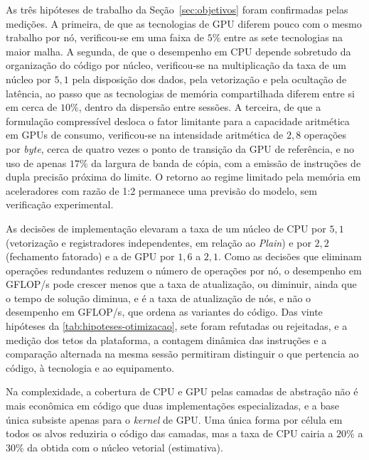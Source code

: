 As três hipóteses de trabalho da Seção~\ref{sec:objetivos} foram confirmadas pelas medições.
A primeira, de que as tecnologias de GPU diferem pouco com o mesmo trabalho por nó, verificou-se em uma faixa de \(5\%\) entre as sete tecnologias na maior malha.
A segunda, de que o desempenho em CPU depende sobretudo da organização do código por núcleo, verificou-se na multiplicação da taxa de um núcleo por \(5{,}1\) pela disposição dos dados, pela vetorização e pela ocultação de latência, ao passo que as tecnologias de memória compartilhada diferem entre si em cerca de \(10\%\), dentro da dispersão entre sessões.
A terceira, de que a formulação compressível desloca o fator limitante para a capacidade aritmética em GPUs de consumo, verificou-se na intensidade aritmética de \(2{,}8\) operações por \textit{byte}, cerca de quatro vezes o ponto de transição da GPU de referência, e no uso de apenas \(17\%\) da largura de banda de cópia, com a emissão de instruções de dupla precisão próxima do limite.
O retorno ao regime limitado pela memória em aceleradores com razão de 1:2 permanece uma previsão do modelo, sem verificação experimental.

As decisões de implementação elevaram a taxa de um núcleo de CPU por \(5{,}1\) (vetorização e registradores independentes, em relação ao \textit{Plain}) e por \(2{,}2\) (fechamento fatorado) e a de GPU por \(1{,}6\) a \(2{,}1\).
Como as decisões que eliminam operações redundantes reduzem o número de operações por nó, o desempenho em GFLOP/s pode crescer menos que a taxa de atualização, ou diminuir, ainda que o tempo de solução diminua, e é a taxa de atualização de nós, e não o desempenho em GFLOP/s, que ordena as variantes do código.
Das vinte hipóteses da \autoref{tab:hipoteses-otimizacao}, sete foram refutadas ou rejeitadas, e a medição dos tetos da plataforma, a contagem dinâmica das instruções e a comparação alternada na mesma sessão permitiram distinguir o que pertencia ao código, à tecnologia e ao equipamento.

Na complexidade, a cobertura de CPU e GPU pelas camadas de abstração não é mais econômica em código que duas implementações especializadas, e a base única subsiste apenas para o \textit{kernel} de GPU.
Uma única forma por célula em todos os alvos reduziria o código das camadas, mas a taxa de CPU cairia a \(20\%\) a \(30\%\) da obtida com o núcleo vetorial (estimativa).
